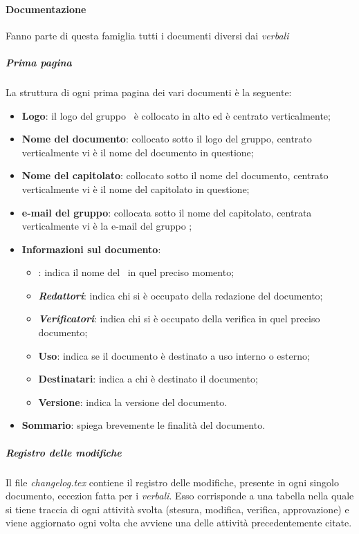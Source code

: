 \paragraph{Documentazione}
Fanno parte di questa famiglia tutti i documenti diversi dai \textit{verbali}
\subparagraph{Prima pagina}
La struttura di ogni prima pagina dei vari documenti è la seguente:
\begin {itemize}
    \item \textbf{Logo}: il logo del gruppo \groupName\ è collocato in alto ed è centrato verticalmente;
    \item \textbf{Nome del documento}: collocato sotto il logo del gruppo, centrato verticalmente vi è il nome del documento in questione;
    \item \textbf{Nome del capitolato}: collocato sotto il nome del documento, centrato verticalmente vi è il nome del capitolato in questione;
    \item \textbf{e-mail del gruppo}: collocata sotto il nome del capitolato, centrata verticalmente vi è la e-mail del gruppo \groupName;
    \item \textbf{Informazioni sul documento}:
        \begin{itemize}
            \item \textbf{\roleProjectManager}: indica il nome del \roleProjectManagerLow\ in quel preciso momento;
            \item \textbf{\textit{Redattori}}: indica chi si è occupato della redazione del documento;
            \item \textbf{\textit{Verificatori}}: indica chi si è occupato della verifica in quel preciso documento;
            \item \textbf{Uso}: indica se il documento è destinato a uso interno o esterno;
            \item \textbf{Destinatari}: indica a chi è destinato il documento;
            \item \textbf{Versione}: indica la versione del documento. 
        \end{itemize}
    \item \textbf{Sommario}: spiega brevemente le finalità del documento.        
\end {itemize}
\subparagraph{Registro delle modifiche}
Il file \textit{changelog.tex} contiene il registro delle modifiche, presente in ogni singolo documento, eccezion fatta per i \textit{verbali}.
Esso corrisponde a una tabella nella quale si tiene traccia di ogni attività svolta (stesura, modifica, verifica, approvazione) e viene aggiornato ogni volta che avviene una delle attività precedentemente citate.
